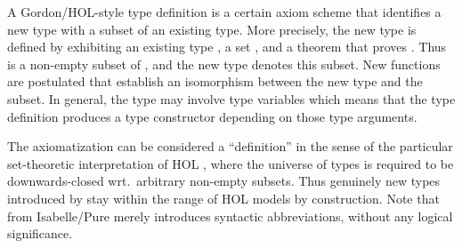 \begin{isabellebody}
\begin{isamarkuptext}
  A Gordon/HOL-style type definition is a certain axiom scheme that
  identifies a new type with a subset of an existing type.  More
  precisely, the new type is defined by exhibiting an existing type
  , a set , and a theorem that proves
  .  Thus  is a non-empty subset of , and the new type denotes this subset.  New functions are
  postulated that establish an isomorphism between the new type and
  the subset.  In general, the type  may involve type
  variables  which means that the type definition
  produces a type constructor  depending on
  those type arguments.

  The axiomatization can be considered a ``definition'' in the sense
  of the particular set-theoretic interpretation of HOL
  \cite{pitts93}, where the universe of types is required to be
  downwards-closed wrt.\ arbitrary non-empty subsets.  Thus genuinely
  new types introduced by \hyperlink{command.typedef}{\mbox{}} stay within the range
  of HOL models by construction.  Note that \hyperlink{command.type-synonym}{\mbox{}} from Isabelle/Pure merely introduces syntactic
  abbreviations, without any logical significance.
  

\end{isamarkuptext}
\end{isabellebody}
